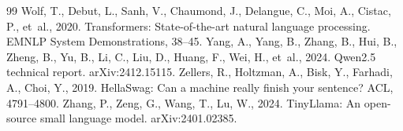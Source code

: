 \documentclass[preprint,12pt,authoryear]{elsarticle}
\begin{document}
\begin{thebibliography}{99}
 Wolf, T., Debut, L., Sanh, V., Chaumond, J., Delangue, C., Moi, A., Cistac, P., et~al., 2020. Transformers: State-of-the-art natural language processing. EMNLP System Demonstrations, 38--45.
 Yang, A., Yang, B., Zhang, B., Hui, B., Zheng, B., Yu, B., Li, C., Liu, D., Huang, F., Wei, H., et~al., 2024. Qwen2.5 technical report. arXiv:2412.15115.
 Zellers, R., Holtzman, A., Bisk, Y., Farhadi, A., Choi, Y., 2019. HellaSwag: Can a machine really finish your sentence? ACL, 4791--4800.
 Zhang, P., Zeng, G., Wang, T., Lu, W., 2024. TinyLlama: An open-source small language model. arXiv:2401.02385.
\end{thebibliography}
\end{document}
